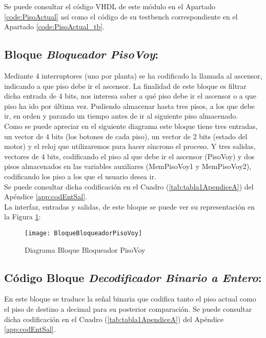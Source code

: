 	Se puede consultar el código VHDL de este módulo en el Apartado \ref{code:PisoActual} así como el código de su testbench correspondiente en el Apartado \ref{code:PisoActual_tb}.\\ 

\subsection{Bloque \textit{Bloqueador PisoVoy}:} \label{bloque:BloqueadorPisoVoy}
    Mediante 4 interruptores (uno por planta) se ha codificado la llamada al ascensor, indicando a que piso debe ir el ascensor. La finalidad de este bloque es filtrar dicha entrada de 4 bits, nos interesa saber a qué piso debe ir el ascensor o a que piso ha ido por última vez. Pudiendo almacenar hasta tres pisos, a los que debe ir, en orden y parando un tiempo antes de ir al siguiente piso almacenado. \\
    
	Como se puede apreciar en el siguiente diagrama este bloque tiene tres entradas, un vector de 4 bits (los botones de cada piso), un vector de 2 bits (estado del motor) y el reloj que utilizaremos para hacer síncrono el proceso. Y tres salidas, vectores de 4 bits, codificando el piso al que debe ir el ascensor (PisoVoy) y dos pisos almacenados en las variables auxiliares (MemPisoVoy1 y MemPisoVoy2), codificando los piso a los que el usuario desea ir. \\
	
	Se puede consultar dicha codificación en el Cuadro (\ref{tab:tabla1ApendiceA}) del Apéndice \ref{app:codEntSal}. \\
    
    La interfaz, entradas y salidas, de este bloque se puede ver su representación en la Figura \ref{fig:BloqueBloqueadorPisoVoy}:
    
    \begin{figure}[H]
		    \centering
		    \hspace*{-1.8cm}
		    \texttt{[image: BloqueBloqueadorPisoVoy]}
		    \caption{Diagrama Bloque Bloqueador PisoVoy}
		    \label{fig:BloqueBloqueadorPisoVoy}
	\end{figure}
	
\subsection{Código Bloque \textit{Decodificador Binario a Entero}:} \label{bloque:DecodificadorBinarioEntero}
	En este bloque se traduce la señal binaria que codifica tanto el piso actual como el piso de destino a decimal para su posterior comparación.
	Se puede consultar dicha codificación en el Cuadro (\ref{tab:tabla1ApendiceA}) del Apéndice \ref{app:codEntSal}. \\ 

